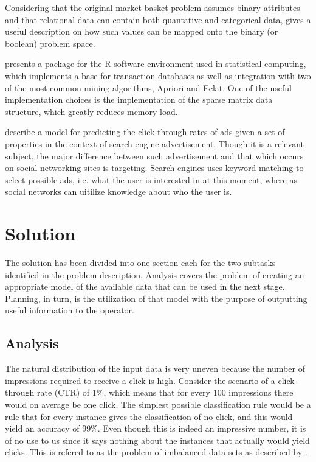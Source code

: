 \documentclass[a4paper]{article}
\begin{document}
Considering that the original market basket problem assumes binary attributes and that relational data can contain both
quantative and categorical data, \citep{Srikant1996} gives a useful description on how such values can be mapped onto the
binary (or boolean) problem space.

\citet{Hahsler2007} presents a package for the R software environment used in statistical computing, which implements a base
for transaction databases as well as integration with two of the most common mining algorithms, Apriori and Eclat. One of the
useful implementation choices is the implementation of the sparse matrix data structure, which greatly reduces memory load.

\citet{Richardson2007} describe a model for predicting the click-through rates of ads given a set of properties in the context
of search engine advertisement. Though it is a relevant subject, the major difference between such advertisement and that which
occurs on social networking sites is targeting. Search engines uses keyword matching to select possible ads, i.e. what the user is
interested in at this moment, where as social networks can uitilize knowledge about who the user is.

\section{Solution}
The solution has been divided into one section each for the two subtasks identified in the problem description. Analysis covers
the problem of creating an appropriate model of the available data that can be used in the next stage. Planning, in turn, is the
utilization of that model with the purpose of outputting useful information to the operator.

\subsection{Analysis}
The natural distribution of the input data is very uneven because the number of impressions required to receive a click is high.
Consider the scenario of a click-through rate (CTR) of 1\%, which means that for every 100 impressions there would on average be one
click. The simplest possible classification rule would be a rule that for every instance gives the classification of no click, and
this would yield an accuracy of 99\%. Even though this is indeed an impressive number, it is of no use to us since it says nothing
about the instances that actually would yield clicks. This is refered to as the problem of imbalanced data sets as described by
\citet{Chawla2004}.
\end{document}
